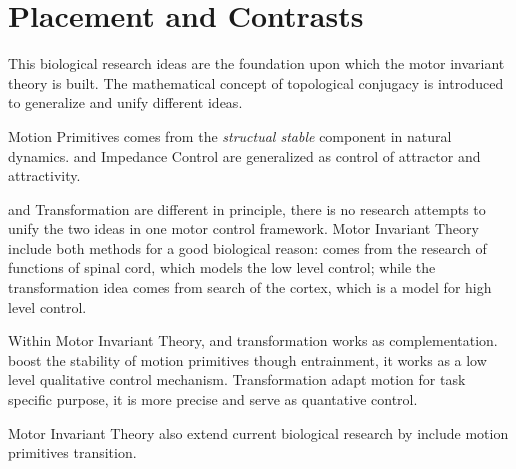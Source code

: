 \section{Placement and Contrasts}
This biological research ideas are the foundation upon which the motor invariant theory is built.
The mathematical concept of topological conjugacy is introduced to generalize and unify different ideas.

Motion Primitives comes from the \emph{structual stable} component in natural dynamics.
\eph and Impedance Control are generalized as control of attractor and attractivity.

\cpg and Transformation are different in principle, there is no research attempts to unify the two ideas in one motor control framework.
Motor Invariant Theory include both methods for a good biological reason: \cpg comes from the research of functions of spinal cord, which models the low level control; while the transformation idea comes from search of the cortex, which is a model for high level control.
 
Within Motor Invariant Theory,  \cpg and transformation works as complementation.
\cpg boost the stability of motion primitives though entrainment, it works as a low level qualitative control mechanism.
Transformation adapt motion for task specific purpose, it is more precise and serve as quantative control.

Motor Invariant Theory also extend current biological research by include motion primitives transition.


 

 



